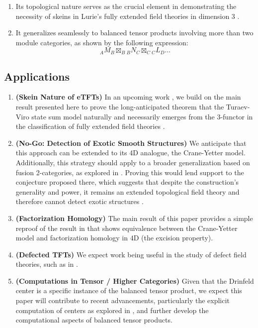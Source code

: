 \begin{enumerate}
  \item Its topological nature serves as the crucial element in demonstrating
        the necessity of skeins in Lurie's fully extended field theories in
        dimension $3$ \cite{lurie/tqft}.
  \item It generalizes seamlessly to balanced tensor products involving more
        than two module categories, as shown by the following expression:
        \[ {}_{A}{M}_{B} \boxtimes_{B} {}_{B}{N}_{C} \boxtimes_{{C}} {}_{C}{L}_{D} \ldots \]
\end{enumerate}

\subsection{Applications} \label{section/applications}

\begin{enumerate}
  \item \textbf{(Skein Nature of eTFTs)} In an upcoming work
        \cite{guu/tv-as-3-functor}, we build on the main result presented here
        to prove the long-anticipated theorem that the Turaev-Viro state sum
        model \cite{viro/turaev-viro-model} naturally and necessarily emerges
        from the 3-functor in the classification of fully extended field
        theories \cite{lurie/tqft}.
  \item \textbf{(No-Go: Detection of Exotic Smooth Structures)} We anticipate
        that this approach can be extended to its 4D analogue, the
        Crane-Yetter model. Additionally, this strategy should apply to a
        broader generalization based on fusion 2-categories, as explored in
        \cite{douglas/fusion-2-cat-4d-tqft}. Proving this would lend support
        to the conjecture proposed there, which suggests that despite the
        construction's generality and power, it remains an extended
        topological field theory and therefore cannot detect exotic structures
        \cite{reutter/no-go-exotic}.
  \item \textbf{(Factorization Homology)} The main result of this paper
        provides a simple reproof of the result in
        \cite{kirillov/fact-homo-4d-tqft} that shows equivalence between the
        Crane-Yetter model and factorization homology
        \cite{ayala/factorization-homology} in $4$D (the excision property).
  \item \textbf{(Defected TFTs)} We expect work being useful in the study of
        defect field theories, such as in \cite{meusburger/defect-tv}.
  \item \textbf{(Computations in Tensor / Higher Categories)} Given that the
        Drinfeld center is a specific instance of the balanced tensor product,
        we expect this paper will contribute to recent advancements,
        particularly the explicit computation of centers as explored in
        \cite{maurer/computing-center}, and further develop the computational
        aspects of balanced tensor products.
\end{enumerate}

